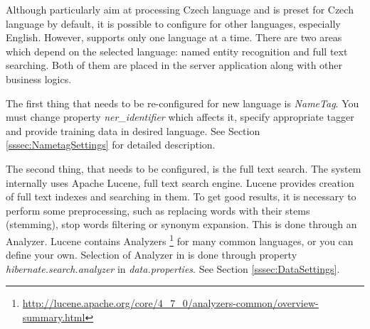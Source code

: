 
Although \textan{} particularly aim at processing Czech language and is preset for
Czech language by default, it is possible to configure \textan{} for other languages,
especially English. However, \textan{} supports only one language at a time. There are
two areas which depend on the selected language: named entity recognition and full
text searching. Both of them are placed in the server application along with other
business logics.

The first thing that needs to be re-configured for new language is {\it NameTag}. 
You must change property {\it ner\_identifier}
which affects it, specify appropriate tagger and provide
training data in desired language. See Section \ref{sssec:NametagSettings} for
detailed description.

The second thing, that needs to be configured, is the full text search. The system
internally uses Apache Lucene, full text search engine. Lucene provides creation
of full text indexes and searching in them. To get good results, it is necessary
to perform some preprocessing, such as replacing words with their stems
(stemming), stop words filtering or synonym expansion. This is done through an
Analyzer. Lucene contains Analyzers%
\footnote{\url{http://lucene.apache.org/core/4_7_0/analyzers-common/overview-summary.html}}
for many common languages, or you can define your own. Selection of Analyzer in 
\textan{} is done through property \emph{hibernate.search.analyzer} in
\emph{data.properties}. See Section \ref{sssec:DataSettings}.
